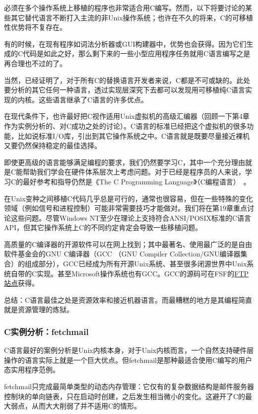 \documentclass[12pt,oneside]{ctexbook}
\begin{document}
\begin{common-format}
必须在多个操作系统上移植的程序也非常适合用C编写。然而，以下将要讨论的某些其它替代语言不断打入主流的非Unix操作系统；也许在不久的将来，C的可移植性优势将不复存在。

有的时候，在现有程序如词法分析器或GUI构建器中，优势也会获得。因为它们生成的C代码是如此之好，那么剩下来的一些小型应用程序任务就用C语言编写之是再合理也不过的了。

当然，已经证明了，对于所有C的替换语言开发者来说，C都是不可或缺的。此处要分析的其它任何一种语言，透过实现层深究下去都可以发现用可移植纯C语言实现的内核。这些语言继承了C语言的许多优点。

在现代条件下，也许最好把C视作适用Unix虚拟机的高级汇编器（回顾一下第4章作为实例分析的、对C成功之处的讨论）。C语言的标准已经把这个虚拟机的很多功能，比如说标准I/O库，引出到其它操作系统之中。C语言就是既要尽量接近裸机又要仍然保持稳定的最佳选择。

即使更高级的语言能够满足编程的要求，我们仍然要学习C，其中一个充分理由就是C能帮助我们学会在硬件体系层次上考虑问题。对于已经是程序员的人来说，学习C的最好参考和指导仍然是《The C Programming Language》（C编程语言）~\cite{Kernighan-Ritchie}。

在Unix变种之间移植C代码几乎总是可行的，通常也很容易，但在一些特殊的变化领域（例如信号和进程控制）可能非常需要技巧才能做对。我们将在第19章重点讨论这些问题。尽管Windows NT至少在理论上支持符合ANSI/POSIX标准的C语言API，但其它操作系统上C的不同约定肯定会导致一些移植问题。

高质量的C编译器的开源软件可以在网上找到；其中最著名、使用最广泛的是自由软件基金会的GNU C编译器（GCC （GNU Compiler Collection/GNU编译器集合）的组成部分），GCC已经成为所有开源Unix系统、甚至很多闭源世界中Unix系统自带的C实现。甚至Microsoft操作系统也有GCC。GCC的源码可在FSF的\href{Kernighan-Ritchie}{FTP站点}获得。

总结：C语言最佳之处是资源效率和接近机器语言。而最糟糕的地方是其编程简直就是资源管理的炼狱。


\subsubsection{C实例分析：fetchmail}
C语言最好的案例分析是Unix内核本身，对于Unix内核而言，一个自然支持硬件层操作的语言实际上就是一个巨大优点。但fetchmail是那种最适合使用C编写的用户态实用程序范例。

fetchmail只完成最简单类型的动态内存管理：它仅有的复杂数据结构是邮件服务器控制块的单向链表，只在启动时创建，之后发生相当微小的变化。这避开了C的最大弱点，从而大大削弱了并不适用C的情形。


\end{common-format}
\end{document}
